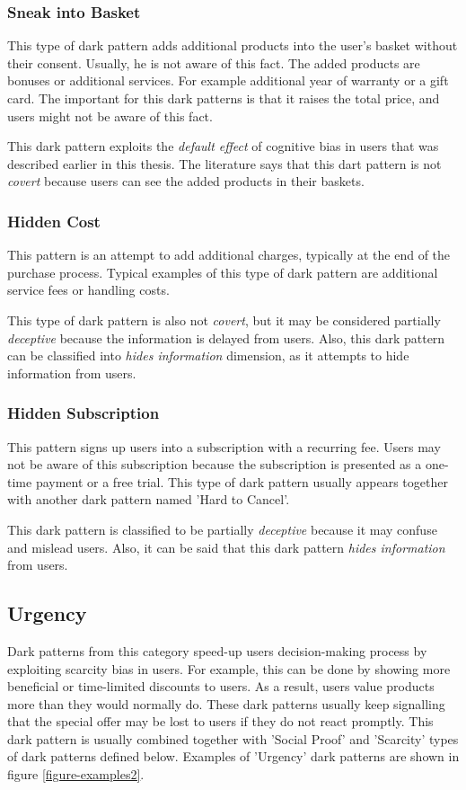         \subsubsection*{Sneak into Basket}
        This type of dark pattern adds additional products into the user's basket without their consent. Usually, he is not aware of this fact. The added products are bonuses or additional services. For example additional year of warranty or a gift card. The important for this dark patterns is that it raises the total price, and users might not be aware of this fact. 
        
        This dark pattern exploits the \emph{default effect} of cognitive bias in users that was described earlier in this thesis. The literature says that this dart pattern is not \emph{covert} because users can see the added products in their baskets.
        \subsubsection*{Hidden Cost}
        This pattern is an attempt to add additional charges, typically at the end of the purchase process. Typical examples of this type of dark pattern are additional service fees or handling costs. 
        
        This type of dark pattern is also not \emph{covert}, but it may be considered partially \emph{deceptive} because the information is delayed from users. Also, this dark pattern can be classified into \emph{hides information} dimension, as it attempts to hide information from users.
        \subsubsection*{Hidden Subscription}
        This pattern signs up users into a subscription with a recurring fee. Users may not be aware of this subscription because the subscription is presented as a one-time payment or a free trial. This type of dark pattern usually appears together with another dark pattern named 'Hard to Cancel'. 
        
        This dark pattern is classified to be partially \emph{deceptive} because it may confuse and mislead users. Also, it can be said that this dark pattern \emph{hides information} from users.
    \subsection{Urgency}
    Dark patterns from this category speed-up users decision-making process by exploiting scarcity bias in users. For example, this can be done by showing more beneficial or time-limited discounts to users. As a result, users value products more than they would normally do. These dark patterns usually keep signalling that the special offer may be lost to users if they do not react promptly. This dark pattern is usually combined together with 'Social Proof' and 'Scarcity' types of dark patterns defined below. Examples of 'Urgency' dark patterns are shown in figure \ref{figure-examples2}.
